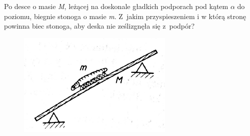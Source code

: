 Po desce o masie \emph{M}, leżącej na doskonale gładkich podporach pod kątem \emph{$\alpha$} do poziomu, biegnie stonoga o masie \emph{m}. Z~jakim przyspieszeniem i w którą stronę powinna biec stonoga, aby deska nie ześlizgnęła się z~podpór?
\begin{figure}[H]
	\centering
	\includegraphics[width=0.3\linewidth]{../rysunki/dynamika/stonoga1.png}
\end{figure}

